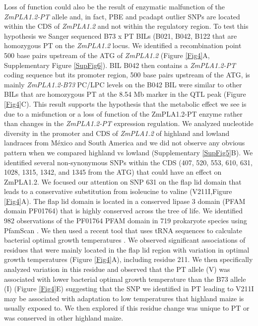 \documentclass[9pt,twocolumn,twoside]{BioRxiv}
\begin{document}
Loss of function could also be the result of enzymatic malfunction of the \textit{ZmPLA1.2-PT} allele and, in fact, PBE and pcadapt outlier SNPs are located within the CDS of \textit{ZmPLA1.2} and not within the regulatory region. To test this hypothesis we Sanger sequenced B73 x PT BILs (B021, B042, B122 that are homozygous PT on the \textit{ZmPLA1.2} locus.
We identified a recombination point 500 base pairs upstream of the ATG of \textit{ZmPLA1.2} (Figure \ref{Fig4}A, Supplementary Figure \ref{SupFig6}).
BIL B042 then contains a \textit{ZmPLA1.2-PT} coding sequence but its promoter region, 500 base pairs upstream of the ATG, is mainly \textit{ZmPLA1.2-B73}  
PC/LPC levels on the B042 BIL were similar to other BILs that are homozygous PT at the 8.54 Mb marker in the QTL peak (Figure \ref{Fig4}C). 
This result supports the hypothesis that the metabolic effect we see is due to a misfunction or a loss of function of the ZmPLA1.2-PT enzyme rather than changes in the \textit{ZmPLA1.2-PT} expression regulation. 
We analyzed nucleotide diversity in the promoter and CDS of \textit{ZmPLA1.2} of highland and lowland landraces from México and South America and we did not observe any obvious pattern  when we compared highland vs lowland (Supplementary \ref{SupFig5}B).
We identified several non-synonymous SNPs within the CDS (407, 520, 553, 610, 631, 1028, 1315, 1342, and 1345 from the ATG) that could have an effect on ZmPLA1.2.
We focused our attention on SNP 631 on the flap lid domain that leads to a conservative substitution from isoleucine to valine (V211I,Figure \ref{Fig4}A).  
The flap lid domain is located in a conserved lipase 3 domain (PFAM domain PF01764) that is highly conserved across the tree of life. 
We identified 982 observations of the PF01764 PFAM domain in 719 prokaryote species using PfamScan \cite{Potter2018-tk, El-Gebali2019-pw}.
We then used a recent tool that uses tRNA sequences to calculate bacterial optimal growth temperatures \cite{Cimen2020-dm}.
We observed significant associations of residues that were mainly located in the flap lid region with variation in optimal growth temperatures (Figure \ref{Fig4}A), including residue 211. 
We then specifically analyzed variation in this residue and observed that the PT allele (V) was associated with lower bacterial optimal growth temperature than the B73 allele (I) (Figure \ref{Fig4}E) suggesting that the SNP we identified in PT leading to V211I may be associated with adaptation to low temperatures that highland maize is usually exposed to. 
We then explored if this residue change was unique to PT or was conserved in other highland maize.
\end{document}
